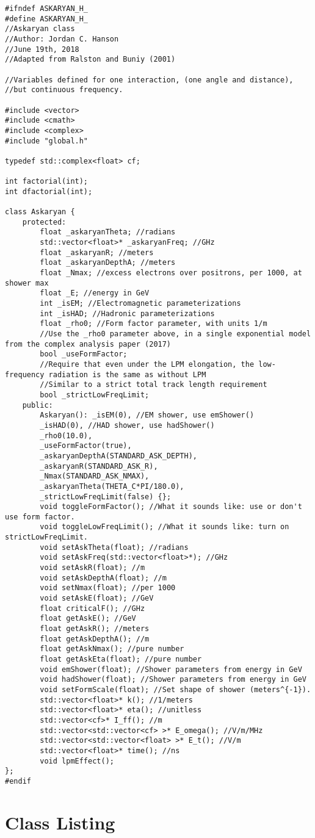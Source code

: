 \documentclass[10pt]{article}
\begin{document}
\begin{verbatim}
#ifndef ASKARYAN_H_
#define ASKARYAN_H_
//Askaryan class
//Author: Jordan C. Hanson
//June 19th, 2018
//Adapted from Ralston and Buniy (2001)

//Variables defined for one interaction, (one angle and distance), 
//but continuous frequency.

#include <vector>
#include <cmath>
#include <complex>
#include "global.h"

typedef std::complex<float> cf;

int factorial(int);
int dfactorial(int);

class Askaryan {
	protected:
		float _askaryanTheta; //radians
		std::vector<float>* _askaryanFreq; //GHz
		float _askaryanR; //meters
		float _askaryanDepthA; //meters
		float _Nmax; //excess electrons over positrons, per 1000, at shower max
		float _E; //energy in GeV
		int _isEM; //Electromagnetic parameterizations
		int _isHAD; //Hadronic parameterizations
		float _rho0; //Form factor parameter, with units 1/m
		//Use the _rho0 parameter above, in a single exponential model from the complex analysis paper (2017)
		bool _useFormFactor;
		//Require that even under the LPM elongation, the low-frequency radiation is the same as without LPM
		//Similar to a strict total track length requirement
		bool _strictLowFreqLimit;
	public:
		Askaryan(): _isEM(0), //EM shower, use emShower()
		_isHAD(0), //HAD shower, use hadShower()
		_rho0(10.0),
		_useFormFactor(true),
		_askaryanDepthA(STANDARD_ASK_DEPTH),
		_askaryanR(STANDARD_ASK_R),
		_Nmax(STANDARD_ASK_NMAX),
		_askaryanTheta(THETA_C*PI/180.0),
		_strictLowFreqLimit(false) {};
		void toggleFormFactor(); //What it sounds like: use or don't use form factor.
		void toggleLowFreqLimit(); //What it sounds like: turn on strictLowFreqLimit.
		void setAskTheta(float); //radians
		void setAskFreq(std::vector<float>*); //GHz
		void setAskR(float); //m
		void setAskDepthA(float); //m
		void setNmax(float); //per 1000
		void setAskE(float); //GeV
		float criticalF(); //GHz
		float getAskE(); //GeV
		float getAskR(); //meters
		float getAskDepthA(); //m
		float getAskNmax(); //pure number
		float getAskEta(float); //pure number
		void emShower(float); //Shower parameters from energy in GeV
		void hadShower(float); //Shower parameters from energy in GeV
		void setFormScale(float); //Set shape of shower (meters^{-1}).
		std::vector<float>* k(); //1/meters
		std::vector<float>* eta(); //unitless
		std::vector<cf>* I_ff(); //m
		std::vector<std::vector<cf> >* E_omega(); //V/m/MHz
		std::vector<std::vector<float> >* E_t(); //V/m
		std::vector<float>* time(); //ns
		void lpmEffect();
};
#endif
\end{verbatim}

\section{Class Listing}
\end{document}
